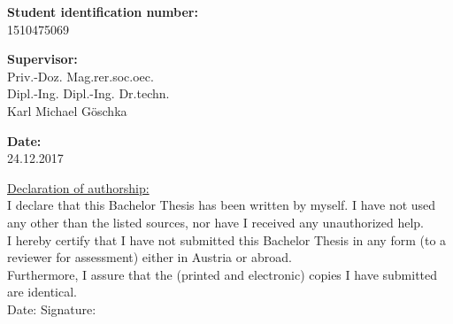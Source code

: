 \begin{center}
  \hspace*{-1.0cm} \textbf{Student identification number:}  \\
  \vspace{0.2cm}
  \hspace*{-1.0cm} 1510475069 \\
  \vspace{0.7cm}

  \hspace*{-1.0cm} \textbf{Supervisor:} \\
  \vspace{0.2cm}
  \hspace*{-1.0cm} Priv.-Doz. Mag.rer.soc.oec.\\
  \hspace*{-1.0cm} Dipl.-Ing. Dipl.-Ing. Dr.techn.\\
  \hspace*{-1.0cm} Karl Michael Göschka \\
  \vspace{0.7cm}

  \hspace*{-1.0cm} \textbf{Date:} \\
  \vspace{0.2cm}
  \hspace*{-1.0cm} 24.12.2017 \\

\end{center}

\thispagestyle{empty}
\newpage

\vspace*{16cm}
\begin{flushleft}
  \underline{Declaration of authorship:}\\
  \vspace{0.5cm}
  I declare that this Bachelor Thesis has been written by myself. I have not used any other than the listed sources, nor have I received any unauthorized help.\\
  \vspace{0.5cm}
  I hereby certify that I have not submitted this Bachelor Thesis in any form (to a reviewer for assessment) either in Austria or abroad.\\
  \vspace{0.5cm}
  Furthermore, I assure that the (printed and electronic) copies I have submitted are identical.\\
  \vspace{1cm}
  Date: \hspace{5.3cm} Signature:
\end{flushleft}
